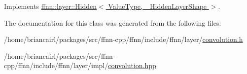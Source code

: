 Implements \hyperlink{classffnn_1_1layer_1_1_hidden_ae038d2a1e64fcbbde6166df7d0573ef8}{ffnn\-::layer\-::\-Hidden$<$ Value\-Type, \-\_\-\-Hidden\-Layer\-Shape $>$}.



The documentation for this class was generated from the following files\-:\begin{DoxyCompactItemize}
\item 
/home/briancairl/packages/src/ffnn-\/cpp/ffnn/include/ffnn/layer/\hyperlink{convolution_8h}{convolution.\-h}\item 
/home/briancairl/packages/src/ffnn-\/cpp/ffnn/include/ffnn/layer/impl/\hyperlink{convolution_8hpp}{convolution.\-hpp}\end{DoxyCompactItemize}
